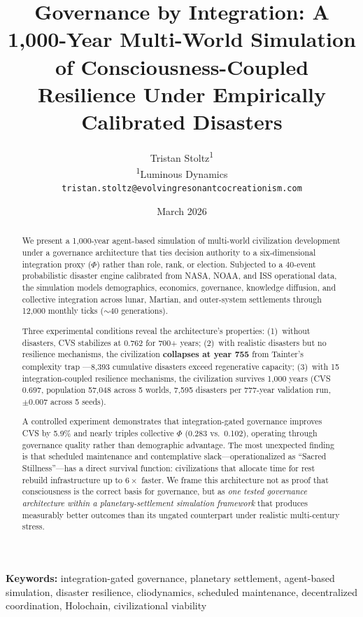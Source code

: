 \documentclass[12pt,a4paper]{article}
\title{Governance by Integration: A 1,000-Year Multi-World Simulation\\
of Consciousness-Coupled Resilience Under Empirically Calibrated Disasters}
\author{
Tristan Stoltz\textsuperscript{1}\\[4pt]
\textsuperscript{1}Luminous Dynamics\\
\texttt{tristan.stoltz@evolvingresonantcocreationism.com}
}
\date{March 2026}
\begin{document}
\maketitle


\begin{abstract}
We present a 1,000-year agent-based simulation of multi-world civilization development under a governance architecture that ties decision authority to a six-dimensional integration proxy ($\Phi$) rather than role, rank, or election. Subjected to a 40-event probabilistic disaster engine calibrated from NASA, NOAA, and ISS operational data, the simulation models demographics, economics, governance, knowledge diffusion, and collective integration across lunar, Martian, and outer-system settlements through 12,000 monthly ticks ($\sim$40 generations).

Three experimental conditions reveal the architecture's properties: (1)~without disasters, CVS stabilizes at $0.762$ for 700+ years; (2)~with realistic disasters but no resilience mechanisms, the civilization \textbf{collapses at year 755} from Tainter's complexity trap \citep{tainter1988collapse}---8,393 cumulative disasters exceed regenerative capacity; (3)~with 15 integration-coupled resilience mechanisms, the civilization survives 1,000 years (CVS $0.697$, population 57,048 across 5 worlds, 7,595 disasters per 777-year validation run, $\pm 0.007$ across 5 seeds).

A controlled experiment demonstrates that integration-gated governance improves CVS by 5.9\% and nearly triples collective $\Phi$ (0.283 vs.\ 0.102), operating through governance quality rather than demographic advantage. The most unexpected finding is that scheduled maintenance and contemplative slack---operationalized as ``Sacred Stillness''---has a direct survival function: civilizations that allocate time for rest rebuild infrastructure up to $6\times$ faster. We frame this architecture not as proof that consciousness is the correct basis for governance, but as \emph{one tested governance architecture within a planetary-settlement simulation framework} that produces measurably better outcomes than its ungated counterpart under realistic multi-century stress.
\end{abstract}

\textbf{Keywords:} integration-gated governance, planetary settlement, agent-based simulation, disaster resilience, cliodynamics, scheduled maintenance, decentralized coordination, Holochain, civilizational viability
\end{document}
